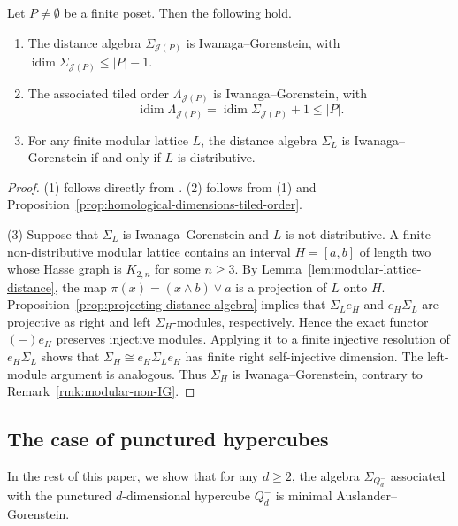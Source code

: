 \documentclass[a4paper,leqno]{amsart}
\begin{document}
\begin{prop}\label{prop:distributive-lattice-IG}
Let $P\neq \emptyset$ be a finite poset. Then the following hold.
\begin{enumerate}[label=\textup{(\arabic*)}]
    \item The distance algebra $\Sigma_{\mathcal J(P)}$ is
    Iwanaga--Gorenstein, with $        \operatorname{idim}\Sigma_{\mathcal J(P)}\leq |P|-1$.
    \item The associated tiled order $\Lambda_{\mathcal J(P)}$
    is Iwanaga--Gorenstein, with
    \[
        \operatorname{idim}\Lambda_{\mathcal J(P)}
        =\operatorname{idim}\Sigma_{\mathcal J(P)}+1
        \leq |P|.
    \]
    \item For any finite modular lattice $L$, the distance algebra $\Sigma_L$ is Iwanaga--Gorenstein if and only if $L$ is distributive.
\end{enumerate}
\end{prop}

\begin{proof}
\textup{(1)} follows directly from
\cite[Theorem~A]{CX2026}. \textup{(2)} follows from \textup{(1)} and Proposition~\ref{prop:homological-dimensions-tiled-order}.

\textup{(3)} Suppose that $\Sigma_L$ is Iwanaga--Gorenstein and $L$ is not distributive. A finite non-distributive modular lattice contains an interval $H=[a,b]$ of length two whose Hasse graph is $K_{2,n}$ for some $n\geq3$. By Lemma~\ref{lem:modular-lattice-distance}, the map $\pi(x)=(x\wedge b)\vee a$ is a projection of $L$ onto $H$. Proposition~\ref{prop:projecting-distance-algebra} implies that $\Sigma_Le_H$ and $e_H\Sigma_L$ are projective as right and left $\Sigma_H$-modules, respectively. Hence the exact functor $(-)e_H$ preserves injective modules. Applying it to a finite injective resolution of $e_H\Sigma_L$ shows that $\Sigma_H\cong e_H\Sigma_Le_H$ has finite right self-injective dimension. The left-module argument is analogous. Thus $\Sigma_H$ is Iwanaga--Gorenstein, contrary to Remark~\ref{rmk:modular-non-IG}.
\end{proof}


\subsection{The case of punctured hypercubes}\label{sec:ex-2-IG}

In the rest of this paper, we show that for any $d\ge 2$, the algebra $\Sigma_{Q_d^-}$ associated with the punctured $d$-dimensional hypercube $Q_d^{-}$ is minimal Auslander--Gorenstein.
\end{document}
